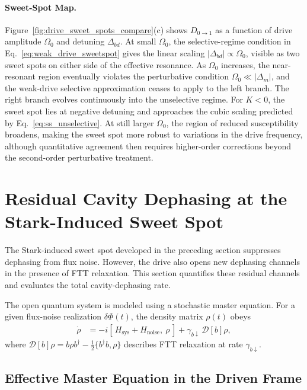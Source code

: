 \paragraph{Sweet-Spot Map.}
Figure~\ref{fig:drive_sweet_spots_compare}(c) shows \(D_{0\rightarrow 1}\) as a function of drive amplitude \(\Omega_0\) and detuning \(\Delta_{bd}\). At small \(\Omega_0\), the selective-regime condition in Eq.~\eqref{eq:weak_drive_sweetspot} gives the linear scaling \(|\Delta_{bd}|\propto\Omega_0\), visible as two sweet spots on either side of the effective resonance. As \(\Omega_0\) increases, the near-resonant region eventually violates the perturbative condition \(\Omega_0\ll|\Delta_m|\), and the weak-drive selective approximation ceases to apply to the left branch. The right branch evolves continuously into the unselective regime. For \(K<0\), the sweet spot lies at negative detuning and approaches the cubic scaling predicted by Eq.~\eqref{eq:ss_unselective}. At still larger \(\Omega_0\), the region of reduced susceptibility broadens, making the sweet spot more robust to variations in the drive frequency, although quantitative agreement then requires higher-order corrections beyond the second-order perturbative treatment.



\section{Residual Cavity Dephasing at the Stark-Induced Sweet Spot}
\label{sec:residual-dephasing}

The Stark-induced sweet spot developed in the preceding section suppresses dephasing from flux noise. However, the drive also opens new dephasing channels in the presence of FTT relaxation. This section quantifies these residual channels and evaluates the total cavity-dephasing rate.

The open quantum system is modeled using a stochastic master equation. For a given flux-noise realization $\delta\Phi(t)$, the density matrix $\rho(t)$ obeys
\begin{align}
\dot{\rho}
&= -i\left[\,H_{\mathrm{sys}} + H_{\mathrm{noise}},\ \rho\,\right]
+ \gamma_{b\downarrow}\,\mathcal{D}[b]\rho,
\label{eq:Lindblad_ch8}\end{align}
where $\mathcal{D}[b]\rho = b\rho b^\dagger - \tfrac{1}{2}\{b^\dagger b, \rho\}$ describes FTT relaxation at rate $\gamma_{b\downarrow}$.

\subsection{Effective Master Equation in the Driven Frame}
\label{subsec:effective-master}


